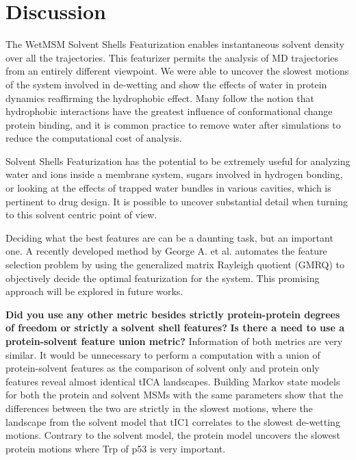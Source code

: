 

\section{Discussion}




The WetMSM Solvent Shells Featurization enables instantaneous solvent density over all the trajectories.  This featurizer permits the analysis of MD trajectories from an entirely different viewpoint. We were able to uncover the slowest motions of the system involved in de-wetting and show the effects of water in protein dynamics reaffirming the hydrophobic effect.  Many follow the notion that hydrophobic interactions have the greatest influence of conformational change protein binding, and it is common practice to remove water after simulations to reduce the computational cost of analysis.

Solvent Shells Featurization has the potential to be extremely useful for analyzing water and ions inside a membrane system, sugars involved in hydrogen bonding, or looking at the effects of trapped water bundles in various cavities, which is pertinent to drug design.  It is possible to  uncover substantial detail when turning to this solvent centric point of view.

Deciding what the best features are can be a daunting task, but an important one. A recently developed method by George A. et al. \cite{george2020laplacian} automates the feature selection problem by using the generalized matrix Rayleigh quotient (GMRQ) to objectively decide the optimal featurization for the system. This promising approach will be explored in future works.


\textbf{Did you use any other metric besides strictly protein-protein degrees of freedom or strictly a solvent shell features?} \textbf{Is there a need to use a protein-solvent feature union metric?} Information of both metrics are very similar. It would be unnecessary to perform a computation with a union of protein-solvent features as the comparison of solvent only and protein only features reveal almost identical tICA landscapes. Building Markov state models for both the protein and solvent MSMs with the same parameters show that the differences between the two are strictly in the slowest motions, where the landscape from the solvent model that tIC1 correlates to the slowest de-wetting motions. Contrary to the solvent model, the protein model uncovers the slowest protein motions where Trp of p53 is very important.

